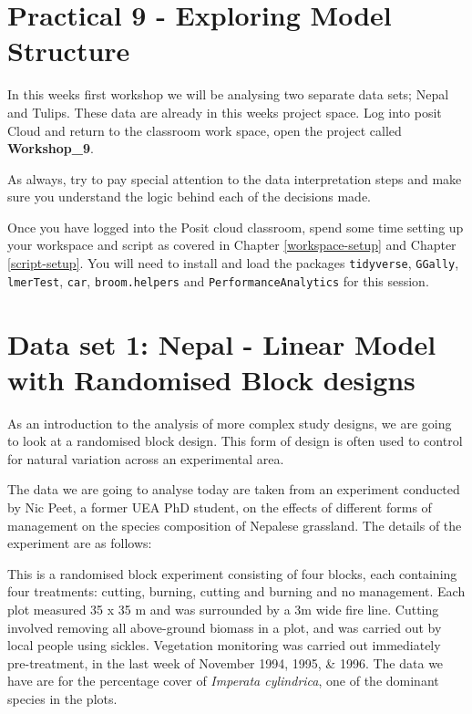 \documentclass[
]{book}
\begin{document}
\section{Practical 9 - Exploring Model Structure}\label{practical-9---exploring-model-structure}

In this weeks first workshop we will be analysing two separate data sets; Nepal and Tulips. These data are already in this weeks project space. Log into posit Cloud and return to the classroom work space, open the project called \textbf{Workshop\_9}.

As always, try to pay special attention to the data interpretation steps and make sure you understand the logic behind each of the decisions made.

Once you have logged into the Posit cloud classroom, spend some time setting up your workspace and script as covered in Chapter \ref{workspace-setup} and Chapter \ref{script-setup}. You will need to install and load the packages \texttt{tidyverse}, \texttt{GGally}, \texttt{lmerTest}, \texttt{car}, \texttt{broom.helpers} and \texttt{PerformanceAnalytics} for this session.

\section{Data set 1: Nepal - Linear Model with Randomised Block designs}\label{data-set-1-nepal---linear-model-with-randomised-block-designs}

As an introduction to the analysis of more complex study designs, we are going to look at a randomised block design. This form of design is often used to control for natural variation across an experimental area.

The data we are going to analyse today are taken from an experiment conducted by Nic Peet, a former UEA PhD student, on the effects of different forms of management on the species composition of Nepalese grassland. The details of the experiment are as follows:

This is a randomised block experiment consisting of four blocks, each containing four treatments: cutting, burning, cutting and burning and no management. Each plot measured 35 x 35 m and was surrounded by a 3m wide fire line. Cutting involved removing all above-ground biomass in a plot, and was carried out by local people using sickles. Vegetation monitoring was carried out immediately pre-treatment, in the last week of November 1994, 1995, \& 1996. The data we have are for the percentage cover of \emph{Imperata cylindrica}, one of the dominant species in the plots.
\end{document}

